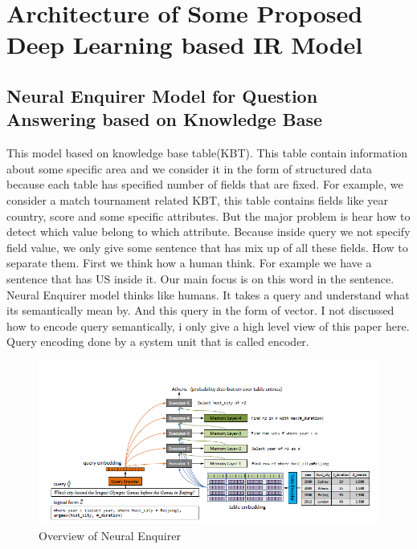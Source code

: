 \documentclass{doublecol-new}
\theoremstyle{TH}{
\newtheorem{lemma}{Lemma}
\newtheorem{theorem}[lemma]{Theorem}
\newtheorem{corrolary}[lemma]{Corrolary}
\newtheorem{conjecture}[lemma]{Conjecture}
\newtheorem{proposition}[lemma]{Proposition}
\newtheorem{claim}[lemma]{Claim}
\newtheorem{stheorem}[lemma]{Wrong Theorem}
\newtheorem{algorithm}{Algorithm}
}
\theoremstyle{THrm}{
\newtheorem{definition}{Definition}[section]
\newtheorem{question}{Question}[section]
\newtheorem{remark}{Remark}
\newtheorem{scheme}{Scheme}
}
\theoremstyle{THhit}{
\newtheorem{case}{Case}[section]
}
\begin{document}
\section{Architecture of Some Proposed Deep Learning based IR Model}

\subsection{Neural Enquirer Model for Question Answering based on Knowledge Base}
This model based on knowledge base table(KBT). This table contain information about some specific area and we consider it in the form of structured data because each table has specified number of fields that are fixed. For example, we consider a match tournament related KBT, this table contains fields like year country, score and some specific attributes. But the major problem is hear how to detect which value belong to which attribute. Because inside query we not specify field value, we only give some sentence that has mix up of all these fields. How to separate them. First we think how a human think. For example we have a sentence that has US inside it. Our main focus is on this word in the sentence. Neural Enquirer model thinks like humans. It takes a query and understand what its semantically mean by. And this query in the form of vector. I not discussed how to encode query semantically, i only give a high level view of this paper here. Query encoding done by a system unit that is called encoder. 
\begin{figure}[t]
	\centerline{\includegraphics[width=\textwidth]{image/neuralENQUIRER.PNG}}
	\label{fig:neuralENQUIRER}
	\caption{Overview of Neural Enquirer}
\end{figure} 
 
\end{document}
